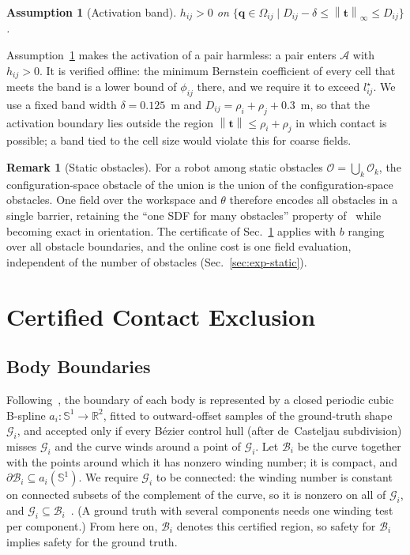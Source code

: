 \documentclass[journal]{IEEEtran}
\newtheorem{assumption}{Assumption}
\theoremstyle{definition}
\newtheorem{remark}{Remark}
\newcommand{\R}{\mathbb{R}}
\newcommand{\Sone}{\mathbb{S}^1}
\newcommand{\norm}[1]{\left\lVert #1\right\rVert}
\begin{document}
\begin{assumption}[Activation band]\label{ass:band}
$h_{ij}>0$ on $\{\mathbf q\in\Omega_{ij}\mid D_{ij}-\delta\le\norm{\mathbf t}_\infty\le D_{ij}\}$.
\end{assumption}
Assumption~\ref{ass:band} makes the activation of a pair harmless: a pair enters $\mathcal A$ with
$h_{ij}>0$. It is verified offline: the minimum Bernstein coefficient of every cell that meets the
band is a lower bound of $\phi_{ij}$ there, and we require it to exceed $l^\star_{ij}$. We use a
fixed band width $\delta=0.125$~m and $D_{ij}=\rho_i+\rho_j+0.3$~m, so that the activation
boundary lies outside the region $\norm{\mathbf t}\le\rho_i+\rho_j$ in which contact is possible;
a band tied to the cell size would violate this for coarse fields.

\begin{remark}[Static obstacles]\label{rem:static}
For a robot among static obstacles $\mathcal O=\bigcup_k\mathcal O_k$, the configuration-space
obstacle of the union is the union of the configuration-space obstacles. One field over the
workspace and $\theta$ therefore encodes all obstacles in a single barrier, retaining the ``one SDF
for many obstacles'' property of~\cite{jo2026geometry} while becoming exact in orientation. The
certificate of Sec.~\ref{sec:cert} applies with $b$ ranging over all obstacle boundaries, and the
online cost is one field evaluation, independent of the number of obstacles
(Sec.~\ref{sec:exp-static}).
\end{remark}

\section{Certified Contact Exclusion}\label{sec:cert}

\subsection{Body Boundaries}\label{sec:cert-body}
Following~\cite{jo2027semantic}, the boundary of each body is represented by a closed periodic cubic
B-spline $a_i:\Sone\to\R^2$, fitted to outward-offset samples of the ground-truth shape
$\mathcal G_i$, and accepted only if every B\'ezier control hull (after de~Casteljau subdivision)
misses $\mathcal G_i$ and the curve winds around a point of $\mathcal G_i$. Let $\mathcal B_i$ be the
curve together with the points around which it has nonzero winding number; it is compact, and
$\partial\mathcal B_i\subseteq a_i(\Sone)$. We require $\mathcal G_i$ to be connected: the winding
number is constant on connected subsets of the complement of the curve, so it is nonzero on all of
$\mathcal G_i$, and $\mathcal G_i\subseteq\mathcal B_i$~\cite{jo2027semantic}. (A ground truth with
several components needs one winding test per component.) From here on, $\mathcal B_i$ denotes this
certified region, so safety for $\mathcal B_i$ implies safety for the ground truth.
\end{document}
